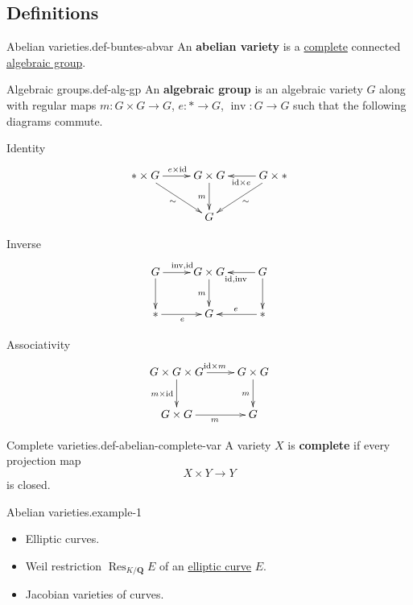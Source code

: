 \documentclass[10pt,]{book}
\newcommand{\terminology}[1]{\textbf{#1}}
\numberwithin{equation}{section}
\newcommand{\QQ}{\mathbf{Q}}
\newcommand{\id}{\mathrm{id}}
\DeclareMathOperator{\Res}{Res}
\begin{document}
\subsection[{Definitions}]{Definitions}\label{subsec-abvar-defs}
\begin{definition}{Abelian varieties.}{def-buntes-abvar}%
\hypertarget{p-5}{}%
An \terminology{abelian variety} is a \hyperref[def-abelian-complete-var]{complete} connected \hyperref[def-alg-gp]{algebraic group}.%
\end{definition}
\begin{definition}{Algebraic groups.}{def-alg-gp}%
\hypertarget{p-6}{}%
An \terminology{algebraic group} is an algebraic variety \(G\) along with regular maps \(m\colon G\times G\to G\), \(e \colon * \to G\),  \(\operatorname{inv}\colon G\to G\) such that the following diagrams commute.%
\par
\hypertarget{p-7}{}%
Identity%
\begin{equation*}
\xymatrix{
\ast\times G\ar[dr]_{\sim}\ar[r]^{e\times \id} & G\times G\ar[d]_m &G\times \ast\ar[l]^{\id\times e}\ar[dl]^\sim\\
& G &
}
\end{equation*}
%
\par
\hypertarget{p-8}{}%
Inverse%
\begin{equation*}
\xymatrix{
G\ar[d]\ar[r]^{\operatorname{inv}, \id} & G\times G\ar[d]_m &G\ar[l]^{\id, \operatorname{inv}}\ar[d]\\
\ast\ar[r]_e& G &\ast\ar[l]_e
}
\end{equation*}
%
\par
\hypertarget{p-9}{}%
Associativity%
\begin{equation*}
\xymatrix{
G \times G \times G \ar[d]_{m\times \id}\ar[r]^{\id\times m} & G\times G\ar[d]_m\\
G\times G\ar[r]_m & G
}
\end{equation*}
%
\end{definition}
\begin{definition}{Complete varieties.}{def-abelian-complete-var}%
\hypertarget{p-10}{}%
A variety \(X\) is \terminology{complete} if every projection map%
\begin{equation*}
X\times Y \to Y
\end{equation*}
is closed.%
\end{definition}
\begin{example}{Abelian varieties.}{example-1}%
\hypertarget{p-11}{}%
\leavevmode%
\begin{itemize}[label=\textbullet]
\item{}Elliptic curves.%
\item{}Weil restriction \(\Res_{K/\QQ} E\) of an \hyperref[def-supersing-isog-ec]{elliptic curve} \(E\).%
\item{}Jacobian varieties of curves.%
\end{itemize}
%
\end{example}
\end{document}
